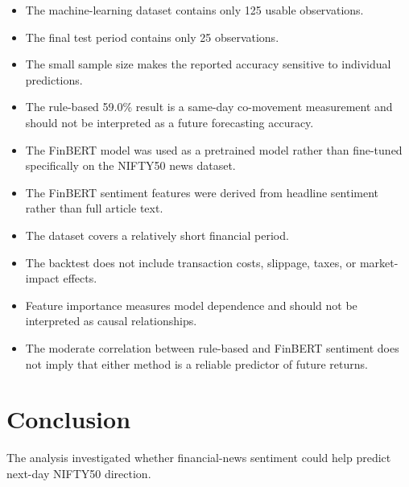 \documentclass[10pt,a4paper]{article}
\begin{document}
	\begin{itemize}[
		leftmargin=*,
		itemsep=1pt,
		topsep=2pt
		]
		
		\item The machine-learning dataset contains only 125 usable
		observations.
		
		\item The final test period contains only 25 observations.
		
		\item The small sample size makes the reported accuracy sensitive
		to individual predictions.
		
		\item The rule-based 59.0\% result is a same-day co-movement
		measurement and should not be interpreted as a future forecasting
		accuracy.
		
		\item The FinBERT model was used as a pretrained model rather than
		fine-tuned specifically on the NIFTY50 news dataset.
		
		\item The FinBERT sentiment features were derived from headline
		sentiment rather than full article text.
		
		\item The dataset covers a relatively short financial period.
		
		\item The backtest does not include transaction costs, slippage,
		taxes, or market-impact effects.
		
		\item Feature importance measures model dependence and should not be
		interpreted as causal relationships.
		
		\item The moderate correlation between rule-based and FinBERT
		sentiment does not imply that either method is a reliable predictor
		of future returns.
		
	\end{itemize}
	
	\section{Conclusion}
	
	The analysis investigated whether financial-news sentiment could help
	predict next-day NIFTY50 direction.
	
\end{document}
